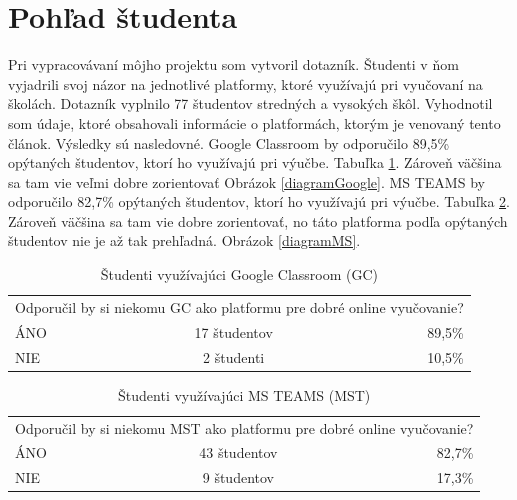 \documentclass[10pt,slovak,a4paper]{article}
\begin{document}
\section{Pohľad študenta} \label{pohľad studenta}
Pri vypracovávaní môjho projektu som vytvoril dotazník. Študenti v ňom vyjadrili svoj názor na jednotlivé platformy, ktoré využívajú pri vyučovaní na školách. Dotazník vyplnilo 77 študentov stredných a vysokých škôl. Vyhodnotil som údaje, ktoré obsahovali informácie o platformách, ktorým je venovaný tento článok. Výsledky sú nasledovné. Google Classroom by odporučilo 89,5\% opýtaných študentov, ktorí ho využívajú pri výučbe. Tabuľka \ref{tab:tabulkaGoogle}. Zároveň väčšina sa tam vie veľmi dobre zorientovať Obrázok \ref{diagramGoogle}. MS TEAMS by odporučilo 82,7\% opýtaných študentov, ktorí ho využívajú pri výučbe. Tabuľka \ref{tab:tabulkaMS}. Zároveň väčšina sa tam vie dobre zorientovať, no táto platforma podľa opýtaných študentov nie je až tak prehľadná.  Obrázok \ref{diagramMS}.


\begin{table}[htbp]
  \centering
  \caption{Študenti využívajúci Google Classroom (GC)}
    \begin{tabular}{|l|cc|r|}
    \toprule
    \multicolumn{4}{|c|}{\multirow{2}[2]{*}{Odporučil by si niekomu GC ako platformu pre dobré online vyučovanie?}} \\
    \multicolumn{4}{|c|}{} \\
    \midrule
    ÁNO   & \multicolumn{2}{c|}{17 študentov} & 89,5\% \\
    \midrule
    NIE   & \multicolumn{2}{c|}{2 študenti} & 10,5\% \\
    \bottomrule
    \end{tabular}%
  \label{tab:tabulkaGoogle}%
\end{table}%


\begin{table}[htbp]
  \centering
  \caption{Študenti využívajúci MS TEAMS (MST)}
    \begin{tabular}{|l|cc|r|}
    \toprule
    \multicolumn{4}{|c|}{\multirow{2}[2]{*}{Odporučil by si niekomu MST ako platformu pre dobré online vyučovanie?}} \\
    \multicolumn{4}{|c|}{} \\
    \midrule
    ÁNO   & \multicolumn{2}{c|}{43 študentov} & 82,7\% \\
    \midrule
    NIE   & \multicolumn{2}{c|}{9 študentov} & 17,3\% \\
    \bottomrule
    \end{tabular}%
  \label{tab:tabulkaMS}%
\end{table}%
\end{document}
